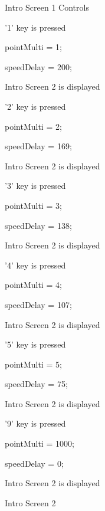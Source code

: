 \-Intro \-Screen 1 \-Controls
\begin{DoxyItemize}
\item '1' key is pressed
\begin{DoxyItemize}
\item point\-Multi = 1;
\item speed\-Delay = 200;
\item \-Intro \-Screen 2 is displayed
\end{DoxyItemize}
\item '2' key is pressed
\begin{DoxyItemize}
\item point\-Multi = 2;
\item speed\-Delay = 169;
\item \-Intro \-Screen 2 is displayed
\end{DoxyItemize}
\item '3' key is pressed
\begin{DoxyItemize}
\item point\-Multi = 3;
\item speed\-Delay = 138;
\item \-Intro \-Screen 2 is displayed
\end{DoxyItemize}
\item '4' key is pressed
\begin{DoxyItemize}
\item point\-Multi = 4;
\item speed\-Delay = 107;
\item \-Intro \-Screen 2 is displayed
\end{DoxyItemize}
\item '5' key is pressed
\begin{DoxyItemize}
\item point\-Multi = 5;
\item speed\-Delay = 75;
\item \-Intro \-Screen 2 is displayed
\end{DoxyItemize}
\item '9' key is pressed
\begin{DoxyItemize}
\item point\-Multi = 1000;
\item speed\-Delay = 0;
\item \-Intro \-Screen 2 is displayed
\end{DoxyItemize}
\end{DoxyItemize}

\-Intro \-Screen 2 

